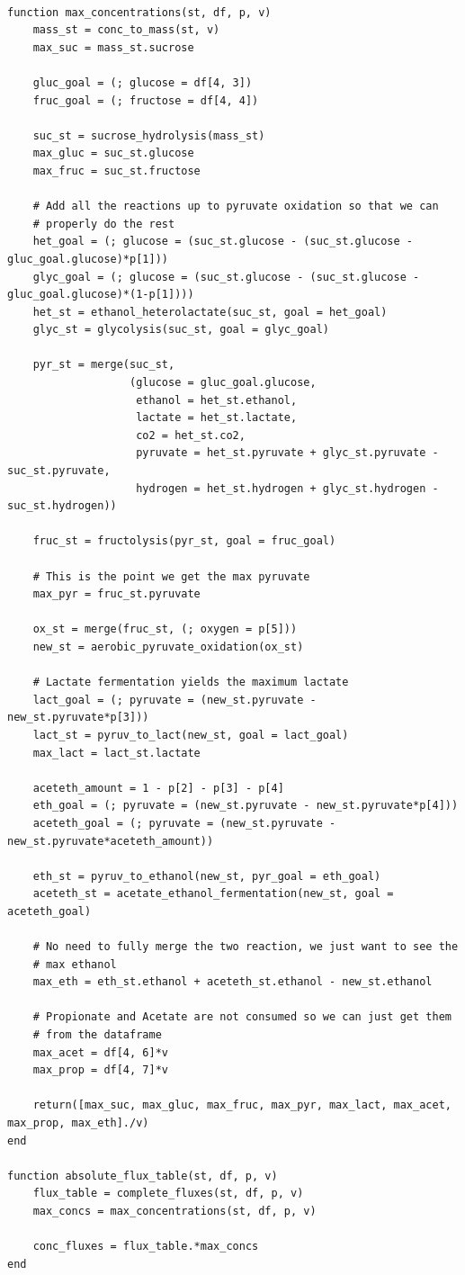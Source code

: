 \documentclass[11pt]{article}
\begin{document}
\begin{verbatim}

function max_concentrations(st, df, p, v)
    mass_st = conc_to_mass(st, v)
    max_suc = mass_st.sucrose

    gluc_goal = (; glucose = df[4, 3])
    fruc_goal = (; fructose = df[4, 4])

    suc_st = sucrose_hydrolysis(mass_st)
    max_gluc = suc_st.glucose
    max_fruc = suc_st.fructose

    # Add all the reactions up to pyruvate oxidation so that we can
    # properly do the rest
    het_goal = (; glucose = (suc_st.glucose - (suc_st.glucose - gluc_goal.glucose)*p[1]))
    glyc_goal = (; glucose = (suc_st.glucose - (suc_st.glucose - gluc_goal.glucose)*(1-p[1])))
    het_st = ethanol_heterolactate(suc_st, goal = het_goal)
    glyc_st = glycolysis(suc_st, goal = glyc_goal)

    pyr_st = merge(suc_st,
                   (glucose = gluc_goal.glucose,
                    ethanol = het_st.ethanol,
                    lactate = het_st.lactate,
                    co2 = het_st.co2,
                    pyruvate = het_st.pyruvate + glyc_st.pyruvate - suc_st.pyruvate,
                    hydrogen = het_st.hydrogen + glyc_st.hydrogen - suc_st.hydrogen))

    fruc_st = fructolysis(pyr_st, goal = fruc_goal)

    # This is the point we get the max pyruvate
    max_pyr = fruc_st.pyruvate

    ox_st = merge(fruc_st, (; oxygen = p[5]))
    new_st = aerobic_pyruvate_oxidation(ox_st)

    # Lactate fermentation yields the maximum lactate
    lact_goal = (; pyruvate = (new_st.pyruvate - new_st.pyruvate*p[3]))
    lact_st = pyruv_to_lact(new_st, goal = lact_goal)
    max_lact = lact_st.lactate

    aceteth_amount = 1 - p[2] - p[3] - p[4]
    eth_goal = (; pyruvate = (new_st.pyruvate - new_st.pyruvate*p[4]))
    aceteth_goal = (; pyruvate = (new_st.pyruvate - new_st.pyruvate*aceteth_amount))

    eth_st = pyruv_to_ethanol(new_st, pyr_goal = eth_goal)
    aceteth_st = acetate_ethanol_fermentation(new_st, goal = aceteth_goal)

    # No need to fully merge the two reaction, we just want to see the
    # max ethanol
    max_eth = eth_st.ethanol + aceteth_st.ethanol - new_st.ethanol

    # Propionate and Acetate are not consumed so we can just get them
    # from the dataframe
    max_acet = df[4, 6]*v
    max_prop = df[4, 7]*v

    return([max_suc, max_gluc, max_fruc, max_pyr, max_lact, max_acet, max_prop, max_eth]./v)
end

function absolute_flux_table(st, df, p, v)
    flux_table = complete_fluxes(st, df, p, v)
    max_concs = max_concentrations(st, df, p, v)

    conc_fluxes = flux_table.*max_concs
end

\end{verbatim}
\end{document}
